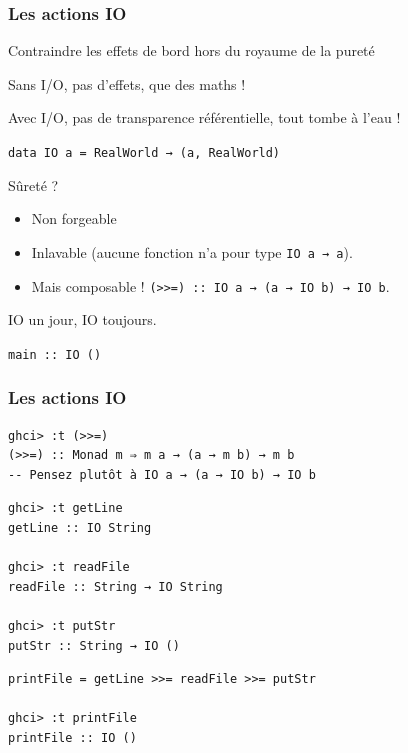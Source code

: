 \documentclass[10pt]{beamer}
\begin{document}
\begin{frame}[fragile]
\frametitle{Les actions IO}
\begin{block}
{Contraindre les effets de bord hors du royaume de la pureté}

Sans I/O, pas d'effets, que des maths !

\pause

Avec I/O, pas de transparence référentielle, tout tombe à l'eau !

\pause

\verb|data IO a = RealWorld → (a, RealWorld)|

\end{block}

\pause

\begin{block}
{Sûreté ?}

\begin{itemize}

\item Non forgeable

\pause

\item Inlavable (aucune fonction n'a pour type \verb|IO a → a|).

\pause

\item Mais composable ! \verb|(>>=) :: IO a → (a → IO b) → IO b|.

\end{itemize}

IO un jour, IO toujours.

\end{block}

\verb|main :: IO ()|

\end{frame}



\begin{frame}[fragile]
\frametitle{Les actions IO}
\begin{verbatim}
ghci> :t (>>=)
(>>=) :: Monad m ⇒ m a → (a → m b) → m b
-- Pensez plutôt à IO a → (a → IO b) → IO b
\end{verbatim}
\pause
\begin{verbatim}
ghci> :t getLine
getLine :: IO String

ghci> :t readFile
readFile :: String → IO String

ghci> :t putStr
putStr :: String → IO ()
\end{verbatim}
\pause
\begin{verbatim}
printFile = getLine >>= readFile >>= putStr

ghci> :t printFile
printFile :: IO ()
\end{verbatim}
\end{frame}
\end{document}
